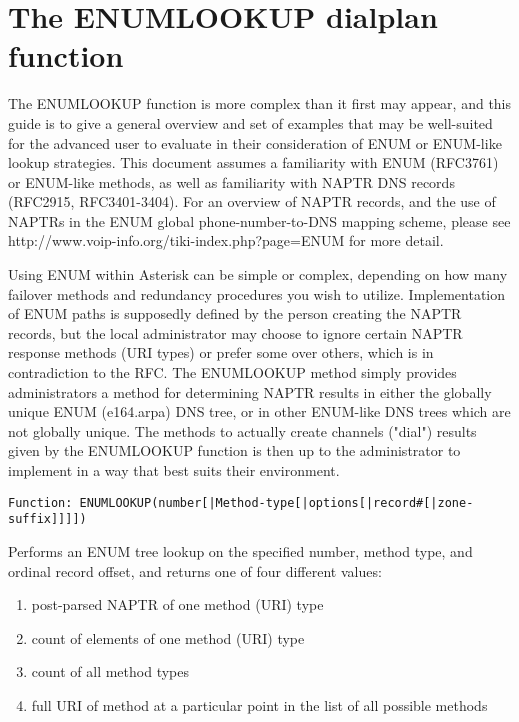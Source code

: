 \section{The ENUMLOOKUP dialplan function}

The ENUMLOOKUP function is more complex than it first may appear, and
this guide is to give a general overview and set of examples that may
be well-suited for the advanced user to evaluate in their
consideration of ENUM or ENUM-like lookup strategies.  This document
assumes a familiarity with ENUM (RFC3761) or ENUM-like methods, as
well as familiarity with NAPTR DNS records (RFC2915, RFC3401-3404).
For an overview of NAPTR records, and the use of NAPTRs in the ENUM
global phone-number-to-DNS mapping scheme, please see
http://www.voip-info.org/tiki-index.php?page=ENUM for more detail.

Using ENUM within Asterisk can be simple or complex, depending on how
many failover methods and redundancy procedures you wish to utilize.
Implementation of ENUM paths is supposedly defined by the person
creating the NAPTR records, but the local administrator may choose to
ignore certain NAPTR response methods (URI types) or prefer some over
others, which is in contradiction to the RFC.  The ENUMLOOKUP method
simply provides administrators a method for determining NAPTR results
in either the globally unique ENUM (e164.arpa) DNS tree, or in other
ENUM-like DNS trees which are not globally unique.  The methods to
actually create channels ("dial") results given by the ENUMLOOKUP
function is then up to the administrator to implement in a way that
best suits their environment.

\begin{verbatim}
Function: ENUMLOOKUP(number[|Method-type[|options[|record#[|zone-suffix]]]])
\end{verbatim}

  Performs an ENUM tree lookup on the specified number, method type, and
  ordinal record offset, and returns one of four different values:

\begin{enumerate}
   \item post-parsed NAPTR of one method (URI) type
   \item count of elements of one method (URI) type
   \item count of all method types
   \item full URI of method at a particular point in the list of all possible methods 
\end{enumerate}

